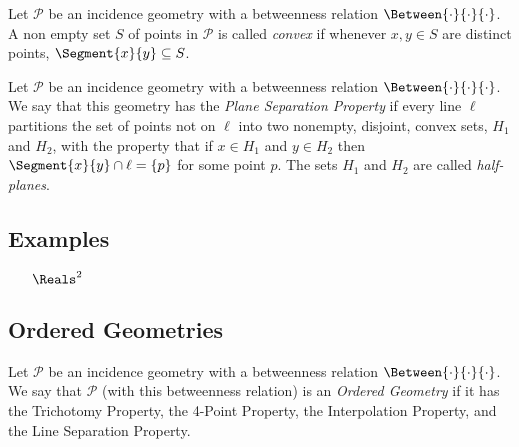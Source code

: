 \documentclass{article}
\begin{document}

\begin{dfn}[Convexity]
Let $\mathcal{P}$ be an incidence geometry with a betweenness relation $\Between{\cdot}{\cdot}{\cdot}$. A non empty set $S$ of points in $\mathcal{P}$ is called \emph{convex} if whenever $x,y \in S$ are distinct points, $\Segment{x}{y} \subseteq S$.
\end{dfn}

\begin{dfn}
Let $\mathcal{P}$ be an incidence geometry with a betweenness relation $\Between{\cdot}{\cdot}{\cdot}$. We say that this geometry has the \emph{Plane Separation Property} if every line $\ell$ partitions the set of points not on $\ell$ into two nonempty, disjoint, convex sets, $H_1$ and $H_2$, with the property that if $x \in H_1$ and $y \in H_2$ then $\Segment{x}{y} \cap \ell = \{p\}$ for some point $p$. The sets $H_1$ and $H_2$ are called \emph{half-planes}.
\end{dfn}

\subsection*{Examples}

\begin{itemize}
\item[$\Reals^2$]
\end{itemize}

\subsection*{Ordered Geometries}

\begin{dfn}
Let $\mathcal{P}$ be an incidence geometry with a betweenness relation $\Between{\cdot}{\cdot}{\cdot}$. We say that $\mathcal{P}$ (with this betweenness relation) is an \emph{Ordered Geometry} if it has the Trichotomy Property, the 4-Point Property, the Interpolation Property, and the Line Separation Property.
\end{dfn}
\end{document}
